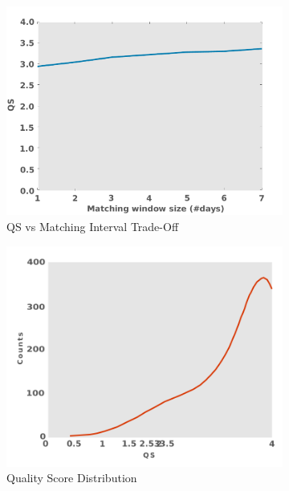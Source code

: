 \documentclass[letterpaper]{article}
\begin{document}
\begin{figure}
\begin{subfigure}{0.40\columnwidth}
    \centering
  \includegraphics[scale=0.2]{matchingwindow}
  \caption{\scriptsize QS vs Matching Interval Trade-Off}
  \label{fig:matchinginterval}
\end{subfigure}\hspace{.5pt}
\begin{subfigure}{0.40\columnwidth}
    \centering
  \includegraphics[scale=.75]{doubleHump_new3}
  \caption{\scriptsize Quality Score Distribution}
  \label{fig:doubleHump}
\end{subfigure}\hspace{.5pt}
\begin{subfigure}{0.40\columnwidth}
    \centering

\end{subfigure}
\end{figure}
\end{document}
